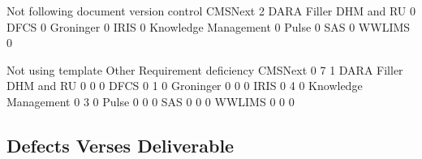 \documentclass{article}
\begin{document}
\begin{Schunk}
\begin{Soutput}
                         Not following document version control
  CMSNext                                                     2
  DARA Filler DHM and RU                                      0
  DFCS                                                        0
  Groninger                                                   0
  IRIS                                                        0
  Knowledge Management                                        0
  Pulse                                                       0
  SAS                                                         0
  WWLIMS                                                      0
                        
                         Not using template Other Requirement deficiency
  CMSNext                                 0     7                      1
  DARA Filler DHM and RU                  0     0                      0
  DFCS                                    0     1                      0
  Groninger                               0     0                      0
  IRIS                                    0     4                      0
  Knowledge Management                    0     3                      0
  Pulse                                   0     0                      0
  SAS                                     0     0                      0
  WWLIMS                                  0     0                      0
\end{Soutput}
\end{Schunk}

\subsection{Defects Verses Deliverable}
\end{document}
